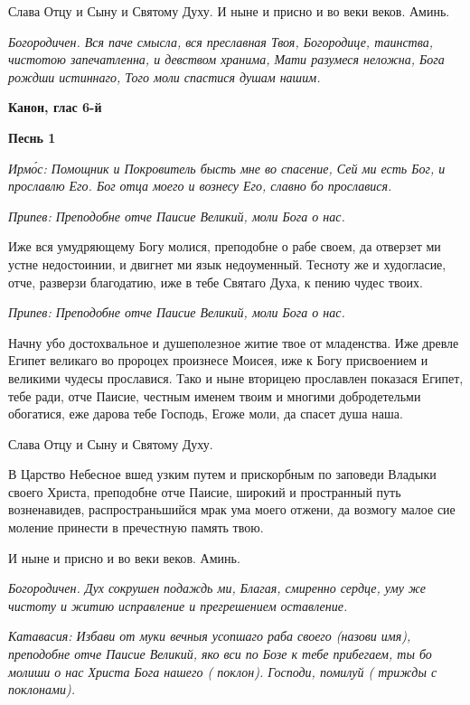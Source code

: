 Слава Отцу и Сыну и Святому Духу. И ныне и присно и во веки веков. Аминь.


\itshape Богородичен.\normalfont{} Вся паче смысла, вся преславная Твоя, Богородице, таинства, чистотою запечатленна, и девством хранима, Мати разумеся неложна, Бога рождши истиннаго, Того моли спастися душам нашим.





\bfseries Канон, глас 6-й\normalfont{}





\bfseries Песнь 1\normalfont{}


\itshape Ирмо́с:\normalfont{} Помощник и Покровитель бысть мне во спасение, Сей ми есть Бог, и прославлю Его. Бог отца моего и вознесу Его, славно бо прославися.


\itshape Припев:\normalfont{} Преподобне отче Паисие Великий, моли Бога о нас.


Иже вся умудряющему Богу молися, преподобне о рабе своем, да отверзет ми устне недостоинии, и двигнет ми язык недоуменный. Тесноту же и худогласие, отче, разверзи благодатию, иже в тебе Святаго Духа, к пению чудес твоих.


\itshape Припев:\normalfont{} Преподобне отче Паисие Великий, моли Бога о нас.


Начну убо достохвальное и душеполезное житие твое от младенства. Иже древле Египет великаго во пророцех произнесе Моисея, иже к Богу присвоением и великими чудесы прославися. Тако и ныне вторицею прославлен показася Египет, тебе ради, отче Паисие, честным именем твоим и многими добродетельми обогатися, еже дарова тебе Господь, Егоже моли, да спасет душа наша.


Слава Отцу и Сыну и Святому Духу.


В Царство Небесное вшед узким путем и прискорбным по заповеди Владыки своего Христа, преподобне отче Паисие, широкий и пространный путь возненавидев, распространьшийся мрак ума моего отжени, да возмогу малое сие моление принести в пречестную память твою.


И ныне и присно и во веки веков. Аминь.


\itshape Богородичен.\normalfont{} Дух сокрушен подаждь ми, Благая, смиренно сердце, уму же чистоту и житию исправление и прегрешением оставление.


\itshape Катавасия:\normalfont{} Избави от муки вечныя усопшаго раба своего \itshape (назови имя)\normalfont{}, преподобне отче Паисие Великий, яко вси по Бозе к тебе прибегаем, ты бо молиши о нас Христа Бога нашего ( \itshape поклон\normalfont{}). Господи, помилуй ( \itshape трижды с поклонами\normalfont{}).


